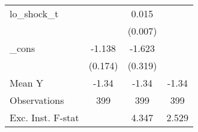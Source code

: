 {\begin{tabular}{l*{3}{c}}
\addlinespace
lo\_shock\_t  &                     &       0.015\sym{**} &                     \\
            &                     &     (0.007)         &                     \\
\addlinespace
\_cons      &      -1.138\sym{***}&      -1.623\sym{***}&                     \\
            &     (0.174)         &     (0.319)         &                     \\
\midrule
Mean Y      &       -1.34         &       -1.34         &       -1.34         \\
Observations&         399         &         399         &         399         \\
Exc. Inst. F-stat&                     &       4.347         &       2.529         \\
\bottomrule
\end{tabular}
}
